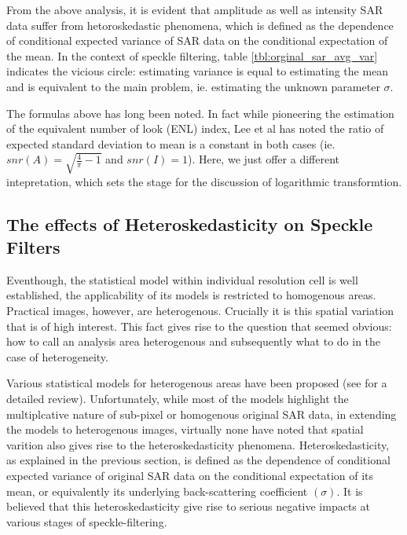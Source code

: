 \documentclass[journal]{IEEEtran}
\begin{document}
From the above analysis, it is evident that amplitude as well as intensity SAR data suffer from hetoroskedastic phenomena, which is defined as the dependence of conditional expected variance of SAR data on the conditional expectation of the mean. 
In the context of speckle filtering, table \ref{tbl:orginal_sar_avg_var} indicates the vicious circle: estimating variance is equal to estimating the mean and is equivalent to the main problem, ie. estimating the unknown parameter $\sigma$. 

The formulas above has long been noted. In fact while pioneering the estimation of the equivalent number of look (ENL) index, Lee et al has noted the ratio of expected standard deviation to mean is a constant in both cases (ie. $snr(A)=\sqrt{\frac{4}{\pi}-1}$ and $snr(I)=1$). Here, we just offer a different intepretation, which sets the stage for the discussion of logarithmic transformtion. 

\subsection{ The effects of Heteroskedasticity on Speckle Filters }

Eventhough, the statistical model within individual resolution cell is well established, the applicability of its models is restricted to homogenous areas. 
Practical images, however, are heterogenous. Crucially it is this spatial variation that is of high interest. This fact gives rise to the question that seemed obvious: how to call an analysis area heterogenous and subsequently what to do in the case of heterogeneity.

Various statistical models for heterogenous areas have been proposed (see \cite{Touzi_2002_TGRS} for a detailed review). 
Unfortunately, while most of the models highlight the multiplcative nature of sub-pixel or homogenous original SAR data, in extending the models to heterogenous images, virtually none have noted that spatial varition also gives rise to the heteroskedasticity phenomena. 
Heteroskedasticity, as explained in the previous section, is defined as the dependence of conditional expected variance of original SAR data on the conditional expectation of its mean, or equivalently its underlying back-scattering coefficient $(\sigma)$. 
It is believed that this heteroskedasticity give rise to serious negative impacts at various stages of speckle-filtering. 
\end{document}

